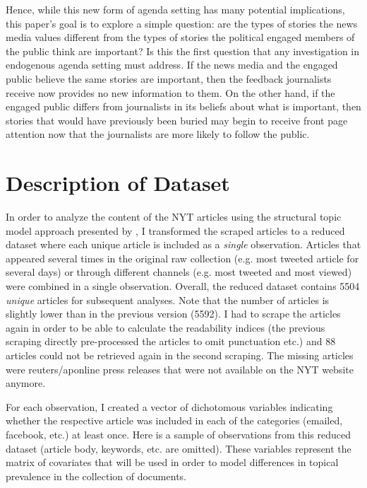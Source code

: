 \documentclass[12pt]{article}
\begin{document}
\begin{doublespace}
Hence, while this new form of agenda setting has many potential implications, this paper's goal is to explore a simple question: are the types of stories the news media values different from the types of stories the political engaged members of the public think are important? Is this the first question that any investigation in endogenous agenda setting must address. If the news media and the engaged public believe the same stories are important, then the feedback journalists receive now provides no new information to them. On the other hand, if the engaged public differs from journalists in its beliefs about what is important, then stories that would have previously been buried may begin to receive front page attention now that the journalists are more likely to follow the public.




\section{Description of Dataset}

In order to analyze the content of the NYT articles using the structural topic model approach presented by \citet{roberts2014structural}, I transformed the scraped articles to a reduced dataset where each unique article is included as a \textit{single} observation. Articles that appeared several times in the original raw collection (e.g. most tweeted article for several days) or through different channels (e.g. most tweeted and most viewed) were combined in a single observation. Overall, the reduced dataset contains 5504 \textit{unique} articles for subsequent analyses. Note that the number of articles is slightly lower than in the previous version (5592). I had to scrape the articles again in order to be able to calculate the readability indices (the previous scraping directly pre-processed the articles to omit punctuation etc.) and 88 articles could not be retrieved again in the second scraping. The missing articles were reuters/aponline press releases that were not available on the NYT website anymore.

For each observation, I created a vector of dichotomous variables indicating whether the respective article was included in each of the categories (emailed, facebook, etc.) at least once. Here is a sample of observations from this reduced dataset (article body, keywords, etc. are omitted). These variables represent the matrix of covariates that will be used in order to model differences in topical prevalence in the collection of documents.


\end{doublespace}
\end{document}
